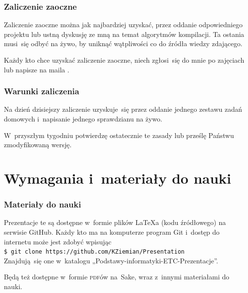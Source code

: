 \documentclass[10pt,t]{beamer}
\begin{document}
\begin{frame}
  \frametitle{Zaliczenie zaoczne}


  Zaliczenie zaoczne można jak najbardziej uzyskać, przez oddanie
  odpowiedniego projektu lub ustną dyskusję ze mną na temat algorytmów
  kompilacji. Ta ostania musi~się odbyć na żywo, by uniknąć wątpliwości
  co do źródła wiedzy zdającego.

  Każdy kto chce uzyskać zaliczenie zaoczne, niech zgłosi~się do mnie po
  zajęciach lub napisze na maila \email.

\end{frame}





\begin{frame}
  \frametitle{Warunki zaliczenia}


  Na dzień dzisiejszy zaliczenie uzyskuje~się przez oddanie jednego zestawu
  zadań domowych i~napisanie jednego sprawdzianu na żywo.

  W~przyszłym tygodniu potwierdzę ostatecznie te zasady lub prześlę Państwu
  zmodyfikowaną wersję.

\end{frame}









\section{Wymagania i~materiały do nauki}



\begin{frame}
  \frametitle{Materiały do nauki}


  Prezentacje te są dostępne w~formie plików \LaTeX a (kodu źródłowego)
  na serwisie GitHub. Każdy kto ma na komputerze program Git i~dostęp
  do internetu może jest zdobyć wpisując \\
  \texttt{\$ git clone https://github.com/KZiemian/Presentation} \\
  Znajdują~się one w~katalogu „Podstawy-informatyki-ETC-Prezentacje”.

  Będą też dostępne w~formie \textsc{pdf}ów na~Sake, wraz z~innymi
  materiałami do nauki.

\end{frame}
\end{document}
